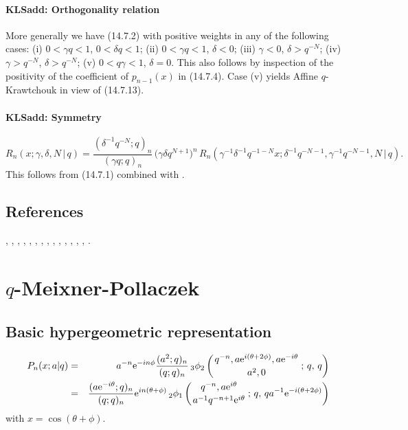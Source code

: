 \documentclass[envcountchap,graybox]{svmono}
\newcounter{rom}
\newcommand{\qhyp}[5]{\mbox{}_{#1}{\phi}_{#2}
\left(\genfrac{}{}{0pt}{}{#3}{#4}\,;\,q,\,#5\right)}
\newcommand{\e}{\textrm{e}}
\newcommand\ga\gamma
\newcommand\de\delta
\newcommand{\qhyp}[5]{\,\mbox{}_{#1}\phi_{#2}\!\left(
  \genfrac{}{}{0pt}{}{#3}{#4};#5\right)}
\begin{document}
\paragraph{\large\bf KLSadd: Orthogonality relation}More generally we have (14.7.2) with positive weights in any of the following
cases:
(i) $0<\ga q<1$, $0<\de q<1$;\quad
(ii) $0<\ga q<1$, $\de<0$;\quad
(iii) $\ga<0$, $\de>q^{-N}$;\quad
(iv) $\ga>q^{-N}$, $\de>q^{-N}$;\quad
(v) $0<q\ga<1$, $\de=0$.
This also follows by inspection of the positivity of the coefficient of
$p_{n-1}(x)$ in (14.7.4).
Case (v) yields Affine $q$-Krawtchouk in view of (14.7.13).
%
\paragraph{\large\bf KLSadd: Symmetry}\begin{equation}
R_n(x;\ga,\de,N\,|\, q)
=\frac{(\de^{-1}q^{-N};q)_n}{(\ga q;q)_n}\,\big(\ga\de q^{N+1}\big)^n\,
R_n(\ga^{-1}\de^{-1}q^{-1-N} x;\de^{-1}q^{-N-1},\ga^{-1}q^{-N-1},N\,|\, q).
\label{89}
\end{equation}
This follows from (14.7.1) combined with .
%

\subsection*{References}
\cite{AlSalam90}, \cite{AlSalamChihara76}, \cite{AlSalamChihara87}, \cite{AskeyIsmail84},
\cite{AskeyRahmanSuslov}, \cite{AtakAtakIII}, \cite{Bryc}, \cite{ChiharaIsmail},
\cite{ChrisIsmail}, \cite{Dehesa}, \cite{Floreanini+97}, \cite{IsmailRahmanSuslov},
\cite{IsmailStanton97}, \cite{KoelinkE}, \cite{Koelink96III}.


\section{$q$-Meixner-Pollaczek}
\par\setcounter{equation}{0}

\subsection*{Basic hypergeometric representation}
\begin{eqnarray}
\label{DefqMP}
P_n(x;a|q)&=&a^{-n}\e^{-in\phi}\frac{(a^2;q)_n}{(q;q)_n}\,
\qhyp{3}{2}{q^{-n},a\e^{i(\theta+2\phi)},a\e^{-i\theta}}{a^2,0}{q}\\
&=&\frac{(a\e^{-i\theta};q)_n}{(q;q)_n}\e^{in(\theta+\phi)}\,
\qhyp{2}{1}{q^{-n},a\e^{i\theta}}{a^{-1}q^{-n+1}\e^{i\theta}}
{qa^{-1}\e^{-i(\theta+2\phi)}}\nonumber
\end{eqnarray}
with $x=\cos(\theta+\phi)$.
\end{document}
